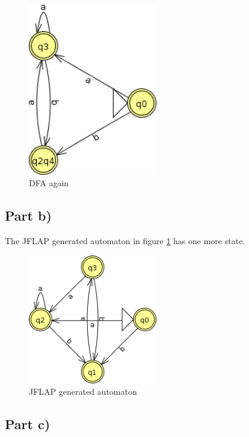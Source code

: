 \documentclass[10pt,a4paper]{article}
\begin{document}
\begin{figure}[h]
  \centering
  \includegraphics[width=0.5\textwidth]{sheet-1/exercise-3-a-dfa}
  \caption{DFA again}
\end{figure}

\subsection*{Part b)}

The JFLAP generated automaton in figure \ref{fig:exercise-3-b} has one more state.

\begin{figure}[h]
  \centering
  \includegraphics[width=0.5\textwidth]{sheet-1/exercise-3-b}
  \caption{JFLAP generated automaton}
  \label{fig:exercise-3-b}
\end{figure}

\subsection*{Part c)}
\end{document}
